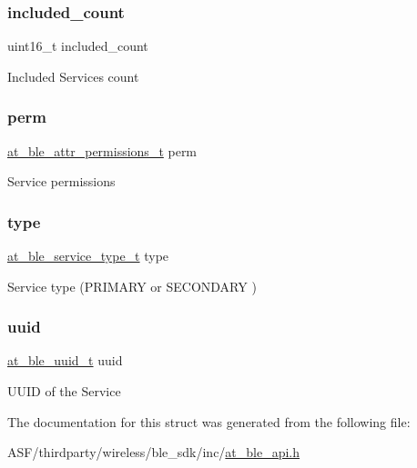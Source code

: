 \subsubsection{\texorpdfstring{included\_count}{included\_count}}
{\footnotesize\ttfamily uint16\+\_\+t included\+\_\+count}

Included Services count \mbox{\label{structat__ble__service__t_a339b801a3a93cf9055c72ff39b60472a}} 
\subsubsection{\texorpdfstring{perm}{perm}}
{\footnotesize\ttfamily \mbox{\hyperlink{at__ble__api_8h_a5d87cd231ea3f9e11846dba7cf75eb61}{at\+\_\+ble\+\_\+attr\+\_\+permissions\+\_\+t}} perm}

Service permissions \mbox{\label{structat__ble__service__t_adbc5707f6d03660b83675c8568bd77b9}} 
\subsubsection{\texorpdfstring{type}{type}}
{\footnotesize\ttfamily \mbox{\hyperlink{at__ble__api_8h_ac5ab059831d8b9a79858a0a3d9abc145}{at\+\_\+ble\+\_\+service\+\_\+type\+\_\+t}} type}

Service type (P\+R\+I\+M\+A\+RY or S\+E\+C\+O\+N\+D\+A\+RY ) \mbox{\label{structat__ble__service__t_a679a8e56540040619aee07eb7a743859}} 
\subsubsection{\texorpdfstring{uuid}{uuid}}
{\footnotesize\ttfamily \mbox{\hyperlink{structat__ble__uuid__t}{at\+\_\+ble\+\_\+uuid\+\_\+t}} uuid}

U\+U\+ID of the Service 

The documentation for this struct was generated from the following file\+:\begin{DoxyCompactItemize}
\item 
A\+S\+F/thirdparty/wireless/ble\+\_\+sdk/inc/\mbox{\hyperlink{at__ble__api_8h}{at\+\_\+ble\+\_\+api.\+h}}\end{DoxyCompactItemize}
